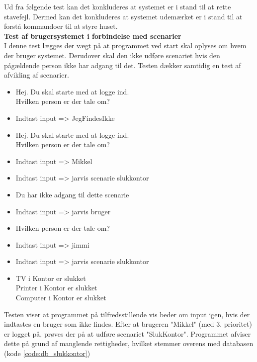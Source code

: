 Ud fra følgende test kan det konkluderes at systemet er i stand til at rette stavefejl. Dermed kan det konkluderes at systemet udemærket er i stand til at forstå kommandoer til at styre huset.\\

{\bf Test af brugersystemet i forbindelse med scenarier}\\
I denne test lægges der vægt på at programmet ved start skal oplyses om hvem der bruger systemet. Derudover skal den ikke udføre scenariet hvis den pågældende person ikke har adgang til det. Testen dækker samtidig en test af afvikling af scenarier.
\begin{itemize}[itemsep=0ex,topsep=1ex]
   \item Hej. Du skal starte med at logge ind. \\Hvilken person er der tale om?
   \item Indtast input => JegFindesIkke
   \item Hej. Du skal starte med at logge ind. \\Hvilken person er der tale om?
   \item Indtast input => Mikkel
   \item Indtast input => jarvis scenarie slukkontor
   \item Du har ikke adgang til dette scenarie
   \item Indtast input => jarvis bruger
   \item Hvilken person er der tale om?
   \item Indtast input => jimmi
   \item Indtast input => jarvis scenarie slukkontor
   \item TV i Kontor er slukket\\
         Printer i Kontor er slukket\\
         Computer i Kontor er slukket
\end{itemize}
Testen viser at programmet på tilfredsstillende vis beder om input igen, hvis der indtastes en bruger som ikke findes. Efter at brugeren "Mikkel" (med 3. prioritet) er logget på, prøves der på at udføre scenariet "SlukKontor". Programmet afviser dette på grund af manglende rettigheder, hvilket stemmer overens med databasen (kode \ref{code:db_slukkontor})\\

